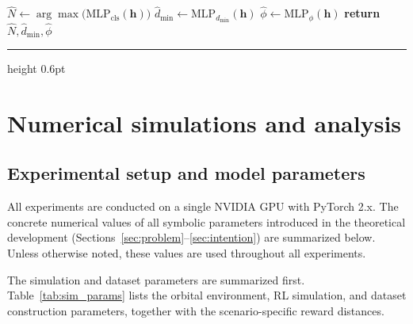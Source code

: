 \documentclass[a4paper,fleqn]{cas-dc}
\begin{document}
\begin{minipage}{\columnwidth}
\begin{algorithmic}[1]
        \State {}
        \State $\hat{N} \gets \arg\max\big(\text{MLP}_{\text{cls}}(\bm{h})\big)$\label{alg:N_cls}
        \State $\hat{d}_{\min} \gets \text{MLP}_{d_{\min}}(\bm{h})$\label{alg:d_reg}
        \State $\hat{\phi} \gets \text{MLP}_{\phi}(\bm{h})$\label{alg:phi_reg}
        \State \textbf{return} $\hat{N}, \hat{d}_{\min}, \hat{\phi}$
    \end{algorithmic}
    \vspace{3pt}
    \hrule height 0.6pt
    \vspace{3pt}
    \noindent{}\label{alg:bigru}
\end{minipage}

\section{Numerical simulations and analysis}\label{sec:simulations}

\subsection{Experimental setup and model parameters}

All experiments are conducted on a single NVIDIA GPU with PyTorch 2.x. The concrete numerical values of all symbolic parameters introduced in the theoretical development (Sections~\ref{sec:problem}--\ref{sec:intention}) are summarized below. Unless otherwise noted, these values are used throughout all experiments.

The simulation and dataset parameters are summarized first. Table~\ref{tab:sim_params} lists the orbital environment, RL simulation, and dataset construction parameters, together with the scenario-specific reward distances.
\end{document}
